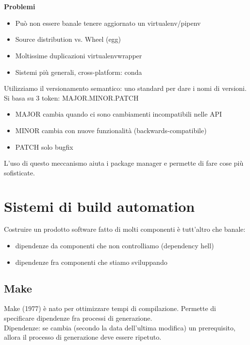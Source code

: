 \\\\ \noindent \textbf{Problemi}
\begin{itemize}
    \item Può non essere banale tenere aggiornato un virtualenv/pipenv
    \item Source distribution vs. Wheel (egg)
    \item Moltissime duplicazioni virtualenvwrapper
    \item Sistemi più generali, cross-platform: conda
\end{itemize}

\noindent Utilizziamo il versionamento semantico: uno standard per dare i nomi di versioni. Si basa su 3 token: MAJOR.MINOR.PATCH
\begin{itemize}
    \item MAJOR cambia quando ci sono cambiamenti incompatibili nelle API
    \item MINOR cambia con nuove funzionalità (backwards-compatibile)
    \item PATCH solo bugfix
\end{itemize}
L'uso di questo meccanismo aiuta i package manager e permette di fare cose più sofisticate.

\section{Sistemi di build automation}
Costruire un prodotto software fatto di molti componenti è tutt'altro che banale:
\begin{itemize}
    \item dipendenze da componenti che non controlliamo (dependency hell)
    \item dipendenze fra componenti che stiamo sviluppando
\end{itemize}

\subsection{Make}
Make (1977) è nato per ottimizzare tempi di compilazione.
Permette di specificare dipendenze fra processi di generazione.\\
Dipendenze: se cambia (secondo la data dell'ultima modifica) un prerequisito, allora il processo di generazione deve essere ripetuto.

